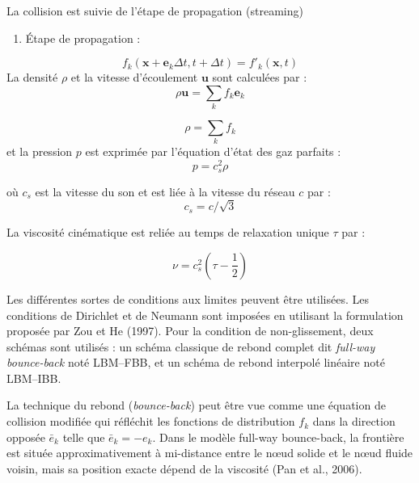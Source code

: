 \documentclass[12pt,a4paper]{report}
\begin{document}
La collision est suivie de l'étape de propagation (streaming) 


\begin{enumerate}
    \item Étape de propagation :
\end{enumerate}
\begin{equation}
f_k(\mathbf{x} + \mathbf{e}_k \Delta t, t + \Delta t) = f'_k(\mathbf{x}, t)
\label{eq:streaming}
\end{equation}
La densité \( \rho \) et la vitesse d’écoulement \( \mathbf{u} \) sont calculées par :
\begin{equation}
\rho \mathbf{u} = \sum_k f_k \mathbf{e}_k
\label{eq:momentum}
\end{equation}

\begin{equation}
\rho = \sum_k f_k
\label{eq:density}
\end{equation}
et la pression \( p \) est exprimée par l’équation d’état des gaz parfaits :
\begin{equation}
p = c_s^2 \rho
\label{eq:pressure}
\end{equation}



où \( c_s \) est la vitesse du son et est liée à la vitesse du réseau \( c \) par :
\begin{equation}
c_s = c / \sqrt{3}
\end{equation}

La viscosité cinématique est reliée au temps de relaxation unique \( \tau \) par :

\begin{equation}
\nu = c_s^2 \left( \tau - \frac{1}{2} \right)
\end{equation}

Les différentes sortes de conditions aux limites peuvent être utilisées. 
Les conditions de Dirichlet et de Neumann sont imposées en utilisant la formulation proposée par Zou et He (1997). 
Pour la condition de non-glissement, deux schémas sont utilisés : un schéma classique de rebond complet dit \textit{full-way bounce-back} noté LBM--FBB, 
et un schéma de rebond interpolé linéaire noté LBM--IBB.

La technique du rebond (\textit{bounce-back}) peut être vue comme une équation de collision modifiée qui réfléchit les fonctions de distribution \( f_k \) dans la direction opposée \( \bar{e}_k \) telle que \( \bar{e}_k = -e_k \). 
Dans le modèle full-way bounce-back, la frontière est située approximativement à mi-distance entre le nœud solide et le nœud fluide voisin, mais sa position exacte dépend de la viscosité (Pan et al., 2006).
\end{document}
